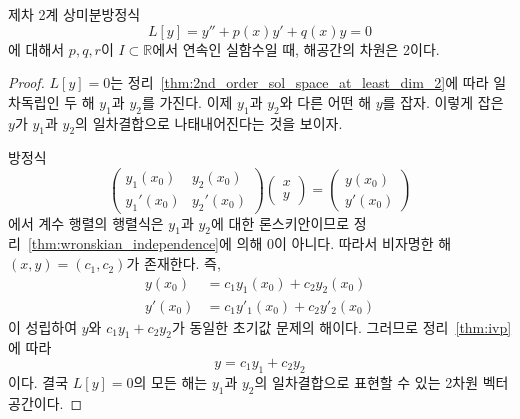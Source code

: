 \documentclass[../engineering_mathematics_lecture_note.tex]{subfiles}
\begin{document}
\begin{theorem}
    제차 2계 상미분방정식
    \begin{equation*}
        L[y] = y'' + p(x) y' + q(x) y = 0
    \end{equation*}
    에 대해서
    $p, q, r$이 $I \subset \mathbb R$에서 연속인 실함수일 때, 해공간의 차원은 2이다.
\end{theorem}

\begin{proof}
    $L[y] = 0$는 정리~\ref{thm:2nd_order_sol_space_at_least_dim_2}에 따라 일차독립인 두 해 $y_1$과 $y_2$를 가진다.
    이제 $y_1$과 $y_2$와 다른 어떤 해 $y$를 잡자.
    이렇게 잡은 $y$가 $y_1$과 $y_2$의 일차결합으로 나태내어진다는 것을 보이자.

    방정식
    \begin{equation*}
        \begin{pmatrix}
            y_1(x_0) & y_2(x_0)\\
            y_1'(x_0) & y_2'(x_0)
        \end{pmatrix} \begin{pmatrix}
            x \\ y
        \end{pmatrix}
        = \begin{pmatrix}
            y(x_0) \\ y'(x_0)
        \end{pmatrix}
    \end{equation*}
    에서 계수 행렬의 행렬식은 $y_1$과 $y_2$에 대한 론스키안이므로 정리~\ref{thm:wronskian_independence}에 의해 0이 아니다.
    따라서 비자명한 해 $(x, y) = (c_1, c_2)$가 존재한다.
    즉,
    \begin{align*}
        y(x_0) &= c_1 y_1(x_0) + c_2 y_2(x_0)\\
        y'(x_0) &= c_1 y'_1(x_0) + c_2 y'_2(x_0)
    \end{align*}
    이 성립하여 $y$와 $c_1 y_1 + c_2 y_2$가 동일한 초기값 문제의 해이다.
    그러므로 정리~\ref{thm:ivp}에 따라
    \begin{equation*}
        y = c_1 y_1 + c_2 y_2
    \end{equation*}
    이다.
    결국 $L[y] = 0$의 모든 해는 $y_1$과 $y_2$의 일차결합으로 표현할 수 있는 2차원 벡터공간이다.
\end{proof}
\end{document}

